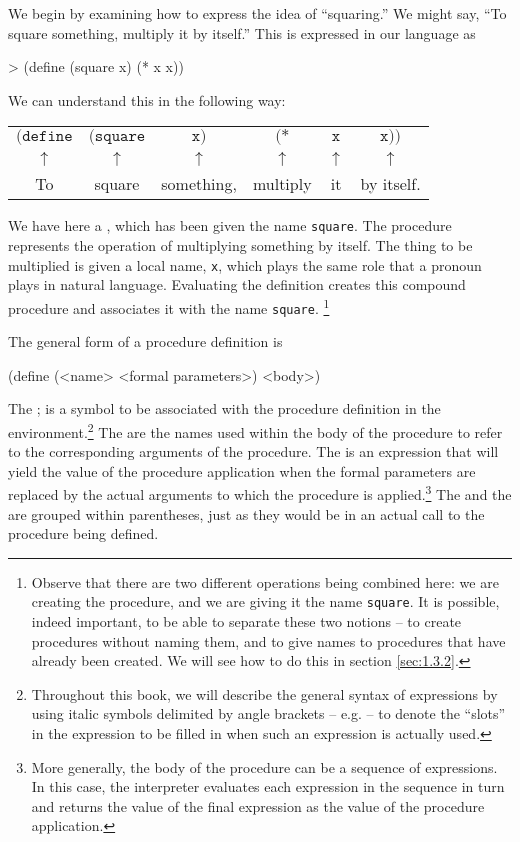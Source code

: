 We begin by examining how to express the idea of ``squaring.''  We
might say, ``To square something, multiply it by itself.''  This is
expressed in our language as 

\begin{schemedisplay}
> (define (square x) (* x x))
\end{schemedisplay}

We can understand this in the following way:

\begin{tabular}{cccccc}
  $\texttt{(define}$ & $\texttt{(square}$ & $\texttt{x)}$ & $\texttt{(*}$ & $\texttt{x}$ & $\texttt{x))}$ \\
  $\uparrow{}$ & $\uparrow{}$ & $\uparrow{}$ & $\uparrow{}$ & $\uparrow{}$ & $\uparrow{}$ \\
  To & square & something, & multiply & it & by itself.
\end{tabular}

We have here a , which has been given the
name \texttt{square}.  The procedure represents the operation of
multiplying something by itself.  The thing to be multiplied is given
a local name, \texttt{x}, which plays the same role that a pronoun
plays in natural language.  Evaluating the definition creates this
compound procedure and associates it with the name \texttt{square}.
\footnote{Observe that there are two different operations being
  combined here: we are creating the procedure, and we are giving it
  the name \texttt{square}.  It is possible, indeed important, to be
  able to separate these two notions -- to create procedures without
  naming them, and to give names to procedures that have already been
  created.  We will see how to do this in section \ref{sec:1.3.2}.}


The general form of a procedure definition is

\begin{schemedisplay}
(define (<name> <formal parameters>) <body>)
\end{schemedisplay}

The ; is a symbol to be associated with the procedure
definition in the environment.\footnote{Throughout this book, we will
  describe the general syntax of expressions by using italic symbols
  delimited by angle brackets -- e.g.  -- to denote the
  ``slots'' in the expression to be filled in when such an expression
  is actually used.} The  are the names used
within the body of the procedure to refer to the corresponding
arguments of the procedure.  The  is an expression that
will yield the value of the procedure application when the formal
parameters are replaced by the actual arguments to which the procedure
is applied.\footnote{More generally, the body of the procedure can be
  a sequence of expressions.  In this case, the interpreter evaluates
  each expression in the sequence in turn and returns the value of the
  final expression as the value of the procedure application.}  The
 and the  are grouped within
parentheses, just as they would be in an actual call to the procedure
being defined.


